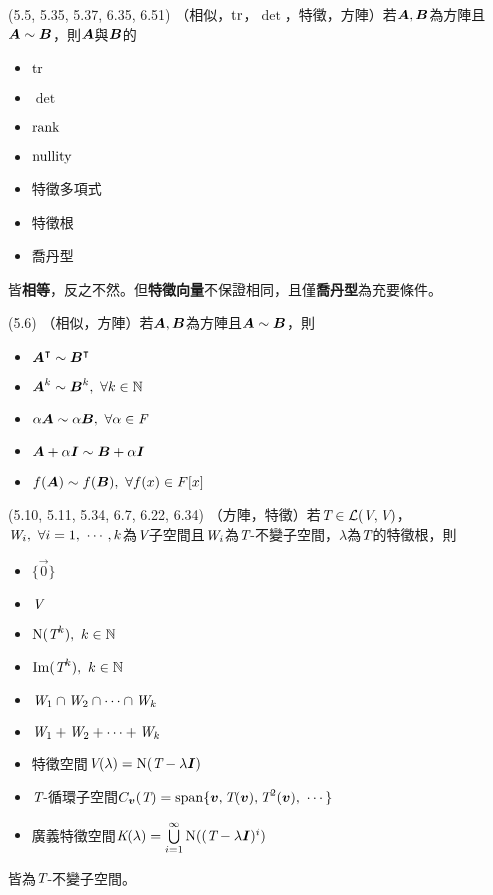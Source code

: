 \item \begin{theorem}{(5.5, 5.35, 5.37, 6.35, 6.51)} （相似，$\operatorname{tr}$，$\det$，特徵，方陣）若$\boldsymbol{A}, \boldsymbol{B}$為方陣且$\boldsymbol{A} \sim \boldsymbol{B}$，則$\boldsymbol{A}$與$\boldsymbol{B}$的
	\begin{itemize}
		\item $\operatorname{tr}$
		\item $\det$
		\item $\operatorname{rank}$
		\item $\operatorname{nullity}$
		\item 特徵多項式
		\item 特徵根
		\item 喬丹型
	\end{itemize}
	皆\textbf{相等}，反之不然。但\textbf{特徵向量}不保證相同，且僅\textbf{喬丹型}為充要條件。
\end{theorem}

\item \begin{theorem}{(5.6)} （相似，方陣）若$\boldsymbol{A}, \boldsymbol{B}$為方陣且$\boldsymbol{A} \sim \boldsymbol{B}$，則
	\begin{itemize}
		\item $\boldsymbol{A}^\intercal \sim \boldsymbol{B}^\intercal$
		\item $\boldsymbol{A}^k \sim \boldsymbol{B}^k, \ \forall k \in \mathbb{N}$
		\item $\alpha\mat{A} \sim \alpha\mat{B}, \ \forall \alpha \in \F$
		\item $\boldsymbol{A} + \alpha \boldsymbol{I} \sim \boldsymbol{B} + \alpha \boldsymbol{I}$
		\item $f(\boldsymbol{A}) \sim f(\boldsymbol{B}), \ \forall f(x) \in F[x]$
	\end{itemize}
\end{theorem}

\item \begin{theorem}{(5.10, 5.11, 5.34, 6.7, 6.22, 6.34)} （方陣，特徵）若$\textit{T} \in \mathcal{L}(\textit{V}, \textit{V})$，$\spc{W}_i, \ \forall i = 1, \ \cdots, k$為$\textit{V}$子空間且$\textit{W}_i$為$\textit{T}$-不變子空間，$\lambda$為$\textit{T}$的特徵根，則
	\begin{itemize}
		\item $\{\vec{0}\}$
		\item $\textit{V}$
		\item $\operatorname{N}(\textit{T}^k), \ k \in \mathbb{N}$
		\item $\operatorname{Im}(\textit{T}^k), \ k \in \mathbb{N}$
		\item $\textit{W}_1 \cap \textit{W}_2 \cap \cdots \cap \textit{W}_k$
		\item $\textit{W}_1 + \textit{W}_2 + \cdots + \textit{W}_k$
		\item 特徵空間$\textit{V}(\lambda) = \operatorname{N}(\textit{T} - \lambda\boldsymbol{I})$
		\item $\textit{T}$-循環子空間$C_{\boldsymbol{v}}(\textit{T}) = \operatorname{span}\{\boldsymbol{v}, \textit{T}(\boldsymbol{v}), \textit{T}^2(\boldsymbol{v}), \ \cdots\}$
		\item 廣義特徵空間$\textit{K}(\lambda) = \bigcup\limits_{i = 1}^{\infty}\operatorname{N}((\textit{T} - \lambda\boldsymbol{I})^i)$
	\end{itemize}
	皆為$\textit{T}$-不變子空間。
\end{theorem}

